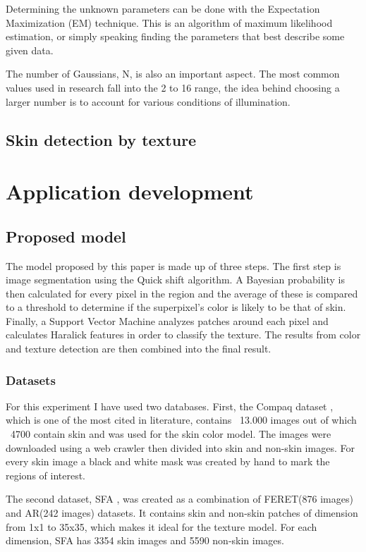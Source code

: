 \documentclass[12pt]{report}
\begin{document}
	Determining the unknown parameters can be done with the Expectation Maximization (EM) technique\cite{Yang99gaussianmixture}. This is an algorithm of maximum likelihood estimation, or simply speaking finding the parameters that best describe some given data.
	
	The number of Gaussians, N, is also an important aspect. The most common values used in research fall into the 2 to 16 range\cite{survey_skin_color_modeling}, the idea behind choosing a larger number is to account for various conditions of illumination.
	
	\section{Skin detection by texture}
	
	\chapter{Application development}
	
	\section{Proposed model}
	The model proposed by this paper is made up of three steps. The first step is image segmentation using the Quick shift algorithm. A Bayesian probability is then calculated for every pixel in the region and the average of these is compared to a threshold to determine if the superpixel's color is likely to be that of skin. Finally, a Support Vector Machine analyzes patches around each pixel and calculates Haralick features in order to classify the texture. The results from color and texture detection are then combined into the final result.
	
	\subsection{Datasets}
	For this experiment I have used two databases. First, the Compaq dataset \cite{compaq}, which is one of the most cited in literature, contains ~13.000 images out of which ~4700 contain skin and was used for the skin color model. The images were downloaded using a web crawler then divided into skin and non-skin images. For every skin image a black and white mask was created by hand to mark the regions of interest.
	
	The second dataset, SFA \cite{sfa}, was created as a combination of FERET(876 images) and AR(242 images)  datasets. It contains skin and non-skin patches of dimension from 1x1 to 35x35, which makes it ideal for the texture model. For each dimension, SFA has 3354 skin images and 5590 non-skin images.
	
\end{document}
